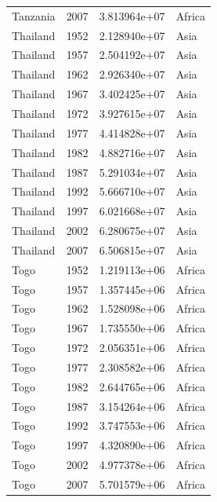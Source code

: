 \documentclass[
  letterpaper,
  DIV=11,
  numbers=noendperiod]{scrreprt}
\begin{document}
\begin{tcolorbox}
\begin{tabular}{lrrl}
Tanzania                 &  2007 &  3.813964e+07 &    Africa \\
Thailand                 &  1952 &  2.128940e+07 &      Asia \\
Thailand                 &  1957 &  2.504192e+07 &      Asia \\
Thailand                 &  1962 &  2.926340e+07 &      Asia \\
Thailand                 &  1967 &  3.402425e+07 &      Asia \\
Thailand                 &  1972 &  3.927615e+07 &      Asia \\
Thailand                 &  1977 &  4.414828e+07 &      Asia \\
Thailand                 &  1982 &  4.882716e+07 &      Asia \\
Thailand                 &  1987 &  5.291034e+07 &      Asia \\
Thailand                 &  1992 &  5.666710e+07 &      Asia \\
Thailand                 &  1997 &  6.021668e+07 &      Asia \\
Thailand                 &  2002 &  6.280675e+07 &      Asia \\
Thailand                 &  2007 &  6.506815e+07 &      Asia \\
Togo                     &  1952 &  1.219113e+06 &    Africa \\
Togo                     &  1957 &  1.357445e+06 &    Africa \\
Togo                     &  1962 &  1.528098e+06 &    Africa \\
Togo                     &  1967 &  1.735550e+06 &    Africa \\
Togo                     &  1972 &  2.056351e+06 &    Africa \\
Togo                     &  1977 &  2.308582e+06 &    Africa \\
Togo                     &  1982 &  2.644765e+06 &    Africa \\
Togo                     &  1987 &  3.154264e+06 &    Africa \\
Togo                     &  1992 &  3.747553e+06 &    Africa \\
Togo                     &  1997 &  4.320890e+06 &    Africa \\
Togo                     &  2002 &  4.977378e+06 &    Africa \\
Togo                     &  2007 &  5.701579e+06 &    Africa \\

\end{tabular}
\end{tcolorbox}
\end{document}
